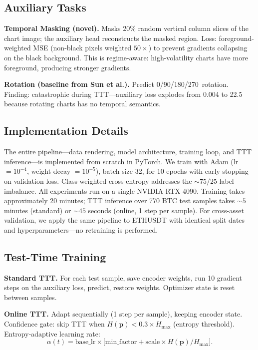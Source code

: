 \documentclass[11pt]{article}
\begin{document}
\subsection{Auxiliary Tasks}
\label{sec:aux_tasks}

\textbf{Temporal Masking (novel).}
Masks 20\% random vertical column slices of the chart image; the auxiliary head
reconstructs the masked region. Loss: foreground-weighted MSE (non-black pixels weighted
$50\!\times$) to prevent gradients collapsing on the black background. This is
regime-aware: high-volatility charts have more foreground, producing stronger gradients.

\textbf{Rotation (baseline from Sun et al.).}
Predict 0\textdegree/90\textdegree/180\textdegree/270\textdegree\ rotation. Finding:
catastrophic during TTT---auxiliary loss explodes from 0.004 to 22.5 because rotating
charts has no temporal semantics.

\subsection{Implementation Details}
\label{sec:impl}

The entire pipeline---data rendering, model architecture, training loop, and TTT
inference---is implemented from scratch in PyTorch. We train with Adam (lr $= 10^{-4}$,
weight decay $= 10^{-5}$), batch size 32, for 10 epochs with early stopping on
validation loss. Class-weighted cross-entropy addresses the ${\sim}75/25$ label imbalance.
All experiments run on a single NVIDIA RTX 4090. Training takes approximately 20 minutes;
TTT inference over 770 BTC test samples takes ${\sim}5$ minutes (standard) or ${\sim}45$
seconds (online, 1 step per sample). For cross-asset validation, we apply the same
pipeline to ETHUSDT with identical split dates and hyperparameters---no retraining is
performed.

\subsection{Test-Time Training}
\label{sec:ttt}

\textbf{Standard TTT.}
For each test sample, save encoder weights, run 10 gradient steps on the auxiliary loss,
predict, restore weights. Optimizer state is reset between samples.

\textbf{Online TTT.}
Adapt sequentially (1 step per sample), keeping encoder state. Confidence gate: skip TTT
when $H(\mathbf{p}) < 0.3 \times H_{\max}$ (entropy threshold). Entropy-adaptive
learning rate:
\begin{equation}
  \alpha(t) = \text{base\_lr} \times
    \bigl[\text{min\_factor} + \text{scale} \times H(\mathbf{p}) / H_{\max}\bigr].
  \label{eq:adaptive_lr}
\end{equation}
\end{document}
